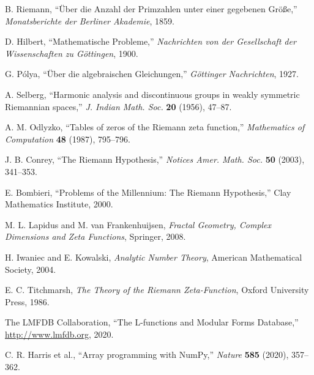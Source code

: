 \documentclass[12pt]{article}
\begin{document}
\begin{thebibliography}{99}

 B. Riemann, ``Über die Anzahl der Primzahlen unter einer gegebenen Größe,'' \textit{Monatsberichte der Berliner Akademie}, 1859.

 D. Hilbert, ``Mathematische Probleme,'' \textit{Nachrichten von der Gesellschaft der Wissenschaften zu Göttingen}, 1900.

 G. Pólya, ``Über die algebraischen Gleichungen,'' \textit{Göttinger Nachrichten}, 1927.

 A. Selberg, ``Harmonic analysis and discontinuous groups in weakly symmetric Riemannian spaces,'' \textit{J. Indian Math. Soc.} \textbf{20} (1956), 47--87.

 A. M. Odlyzko, ``Tables of zeros of the Riemann zeta function,'' \textit{Mathematics of Computation} \textbf{48} (1987), 795--796.

 J. B. Conrey, ``The Riemann Hypothesis,'' \textit{Notices Amer. Math. Soc.} \textbf{50} (2003), 341--353.

 E. Bombieri, ``Problems of the Millennium: The Riemann Hypothesis,'' Clay Mathematics Institute, 2000.

 M. L. Lapidus and M. van Frankenhuijsen, \textit{Fractal Geometry, Complex Dimensions and Zeta Functions}, Springer, 2008.

 H. Iwaniec and E. Kowalski, \textit{Analytic Number Theory}, American Mathematical Society, 2004.

 E. C. Titchmarsh, \textit{The Theory of the Riemann Zeta-Function}, Oxford University Press, 1986.

 The LMFDB Collaboration, ``The L-functions and Modular Forms Database,'' \url{http://www.lmfdb.org}, 2020.

 C. R. Harris et al., ``Array programming with NumPy,'' \textit{Nature} \textbf{585} (2020), 357--362.

\end{thebibliography}
\end{document}
